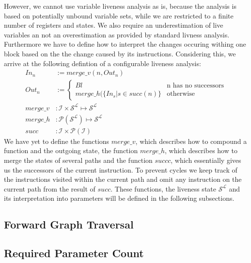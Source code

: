 However, we cannot use variable liveness analysis as is, because the analysis is based on potentially unbound variable sets, while we are restricted to a finite number of registers and states. We also require an underestimation of live variables an not an overestimation as provided by standard livness analysis. Furthermore we have to define how to interpret the changes occuring withing one block based on the the change caused by its instructions. Considering this, we arrive at the following defintion of a configurable liveness analysis:
\begin{subequations}
\label{eq:livenesscustom}
\begin{align}
In_n &:= merge\_v(n, Out_n)\label{eq:livenesscustomIn} \\
Out_n &:= \left\{
  \begin{array}{lr}
    Bl & \text{n has no successors}\\
    merge\_h( \{ In_s | s \in succ(n) \} & \text{otherwise}
  \end{array}
\right. \label{eq:livenesscustomOut}\\
merge\_v &: \mathcal{I} \times \mathcal{S}^\mathcal{L} \mapsto \mathcal{S}^\mathcal{L}\\
merge\_h &: \mathcal{P}(\mathcal{S}^\mathcal{L})  \mapsto \mathcal{S}^\mathcal{L}\\
succ &: \mathcal{I} \times \mathcal{P}(\mathcal{I})
\end{align}
\end{subequations}
We have yet to define the functions $merge\_v$, which describes how to compound a function and the outgoing state, the function $merge\_h$, which describes how to merge the states of several paths and the function $succc$, which essentially gives us the successors of the current instruction. To prevent cycles we keep track of the instructions visited within the current path and omit any instruction on the current path from the result of $succ$. These functions, the liveness state $\mathcal{S}^\mathcal{L}$ and its interpretation into parameters will be defined in the following subsections.

\subsection{Forward Graph Traversal}
\label{subsection:forwardgraphtraversal}


\subsection{Required Parameter Count}
\label{subsection:requiredparamcount}

